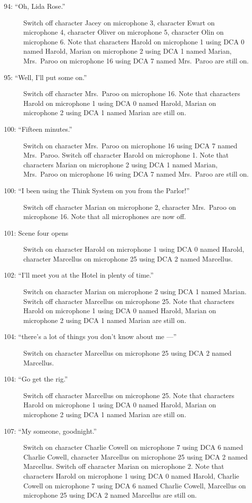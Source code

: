 \begin{description}
\item[94: ``Oh, Lida Rose.'']
Switch off character Jacey on microphone 3, character Ewart on microphone 4, character Oliver on microphone 5, character Olin on microphone 6. Note that characters Harold on microphone 1 using DCA 0 named Harold, Marian on microphone 2 using DCA 1 named Marian, Mrs.~Paroo on microphone 16 using DCA 7 named Mrs.~Paroo are still on.  

\item[95: ``Well, I'll put some on.'']
Switch off character Mrs.~Paroo on microphone 16. Note that characters Harold on microphone 1 using DCA 0 named Harold, Marian on microphone 2 using DCA 1 named Marian are still on.  

\item[100: ``Fifteen minutes.'']
Switch on character Mrs.~Paroo on microphone 16 using DCA 7 named Mrs.~Paroo. Switch off character Harold on microphone 1. Note that characters Marian on microphone 2 using DCA 1 named Marian, Mrs.~Paroo on microphone 16 using DCA 7 named Mrs.~Paroo are still on.  

\item[100: ``I been using the Think System on you from the Parlor!'']
Switch off character Marian on microphone 2, character Mrs.~Paroo on microphone 16. Note that all microphones are now off.

\item[101: Scene four opens]
Switch on character Harold on microphone 1 using DCA 0 named Harold, character Marcellus on microphone 25 using DCA 2 named Marcellus. 

\item[102: ``I'll meet you at the Hotel in plenty of time.'']
Switch on character Marian on microphone 2 using DCA 1 named Marian. Switch off character Marcellus on microphone 25. Note that characters Harold on microphone 1 using DCA 0 named Harold, Marian on microphone 2 using DCA 1 named Marian are still on.  

\item[104: ``there's a lot of things you don't know about me ---'']
Switch on character Marcellus on microphone 25 using DCA 2 named Marcellus. 

\item[104: ``Go get the rig.'']
Switch off character Marcellus on microphone 25. Note that characters Harold on microphone 1 using DCA 0 named Harold, Marian on microphone 2 using DCA 1 named Marian are still on.  

\item[107: ``My someone, goodnight.'']
Switch on character Charlie Cowell on microphone 7 using DCA 6 named Charlie Cowell, character Marcellus on microphone 25 using DCA 2 named Marcellus. Switch off character Marian on microphone 2. Note that characters Harold on microphone 1 using DCA 0 named Harold, Charlie Cowell on microphone 7 using DCA 6 named Charlie Cowell, Marcellus on microphone 25 using DCA 2 named Marcellus are still on.  


\end{description}
